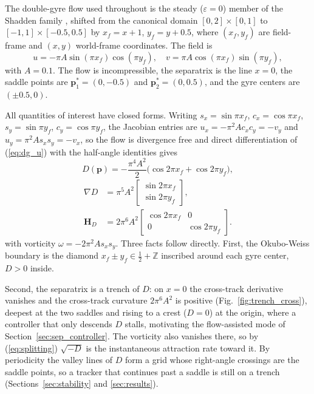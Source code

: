 \documentclass[lettersize,journal]{IEEEtran}
\begin{document}
The double-gyre flow used throughout is the steady ($\varepsilon = 0$)
member of the Shadden family \cite{8}, shifted from the canonical domain
$[0,2] \times [0,1]$ to $[-1,1] \times [-0.5, 0.5]$ by
$x_f = x + 1$, $y_f = y + 0.5$, where $(x_f, y_f)$ are field-frame and
$(x, y)$ world-frame coordinates. The field is
\begin{equation}
    u = -\pi A \sin(\pi x_f) \cos(\pi y_f), \quad
    v = \pi A \cos(\pi x_f) \sin(\pi y_f),
    \label{eq:dg_u}
\end{equation}
with $A = 0.1$. The flow is incompressible, the separatrix is the line
$x = 0$, the saddle points are $\mathbf{p}^*_1 = (0, -0.5)$ and
$\mathbf{p}^*_2 = (0, 0.5)$, and the gyre centers are $(\pm 0.5, 0)$.

All quantities of interest have closed forms. Writing $s_x = \sin\pi
x_f$, $c_x = \cos\pi x_f$, $s_y = \sin\pi y_f$, $c_y = \cos\pi y_f$,
the Jacobian entries are $u_x = -\pi^2 A c_x c_y = -v_y$ and $u_y =
\pi^2 A s_x s_y = -v_x$, so the flow is divergence free and direct
differentiation of (\ref{eq:dg_u}) with the half-angle identities
gives
\begin{equation}
    D(\mathbf{p}) = -\frac{\pi^4 A^2}{2}
    \bigl(\cos 2\pi x_f + \cos 2\pi y_f\bigr),
    \label{eq:det_analytic_main}
\end{equation}
\begin{equation}
    \begin{aligned}
    \nabla D &= \pi^5 A^2
    \begin{bmatrix} \sin 2\pi x_f \\ \sin 2\pi y_f \end{bmatrix},
    \\
    \mathbf{H}_D &= 2\pi^6 A^2
    \begin{bmatrix} \cos 2\pi x_f & 0 \\ 0 & \cos 2\pi y_f \end{bmatrix}.
    \end{aligned}
    \label{eq:gradhess_analytic_main}
\end{equation}
with vorticity $\omega = -2\pi^2 A s_x s_y$. Three facts follow
directly. First, the Okubo-Weiss boundary is the diamond
$x_f \pm y_f \in \tfrac{1}{2} + \mathbb{Z}$ inscribed around each gyre
center, $D > 0$ inside.

Second, the separatrix is a trench of $D$: on $x = 0$ the cross-track
derivative vanishes and the cross-track curvature $2\pi^6 A^2$ is
positive (Fig.~\ref{fig:trench_cross}), deepest at the two saddles and
rising to a crest ($D = 0$) at the origin, where a controller that
only descends $D$ stalls, motivating the flow-assisted mode of
Section~\ref{sec:sep_controller}. The vorticity also vanishes there, so
by (\ref{eq:splitting}) $\sqrt{-D}$ is the instantaneous attraction
rate toward it. By periodicity the valley lines of $D$ form a grid
whose right-angle crossings are the saddle points, so a tracker that
continues past a saddle is still on a trench
(Sections~\ref{sec:stability} and \ref{sec:results}).
\end{document}
